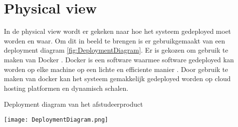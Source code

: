 \section{Physical view}
In de physical view wordt er gekeken naar hoe het systeem gedeployed moet worden en waar.
Om dit in beeld te brengen is er gebruikgemaakt van een deployment diagram \ref{fig:DeploymentDiagram}.
Er is gekozen om gebruik te maken van Docker \Parencite{Docker}.
Docker is een software waarmee software gedeployed kan worden op elke machine op een lichte en efficiente manier \Parencite{Docker}.
Door gebruik te maken van docker kan het systeem gemakkelijk gedeployed worden op cloud hosting platformen en dynamisch schalen.

\whitespace
\begin{graphic}
    \captionsetup{type=figure}
    \caption{Deployment diagram van het afstudeerproduct}
    \texttt{[image: DeploymentDiagram.png]}
    \label{fig:DeploymentDiagram}
\end{graphic}
